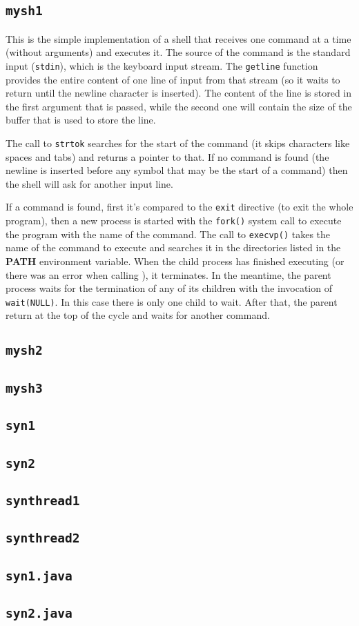 \subsection{\texttt{mysh1}}
This is the simple implementation of a shell that receives one command at a time (without arguments) and executes it. The source of the command is the standard input (\texttt{stdin}), which is the keyboard input stream. The \texttt{getline} function provides the entire content of one line of input from that stream (so it waits to return until the newline character is inserted). The content of the line is stored in the first argument that is passed, while the second one will contain the size of the buffer that is used to store the line. \newline

The call to \texttt{strtok} searches for the start of the command (it skips characters like spaces and tabs) and returns a pointer to that. If no command is found (the newline is inserted before any symbol that may be the start of a command) then the shell will ask for another input line. \newline

If a command is found, first it's compared to the \texttt{exit} directive (to exit the whole program), then a new process is started with the \texttt{fork()} system call to execute the program with the name of the command. The call to \texttt{execvp()} takes the name of the command to execute and searches it in the directories listed in the \textbf{PATH} environment variable.
When the child process has finished executing (or there was an error when calling ), it terminates. In the meantime, the parent process waits for the termination of any of its children with the invocation of \texttt{wait(NULL)}. In this case there is only one child to wait. After that, the parent return at the top of the cycle and waits for another command.
\subsection{\texttt{mysh2}}
\subsection{\texttt{mysh3}}
\subsection{\texttt{syn1}}
\subsection{\texttt{syn2}}
\subsection{\texttt{synthread1}}
\subsection{\texttt{synthread2}}
\subsection{\texttt{syn1.java}}
\subsection{\texttt{syn2.java}}


\clearpage



